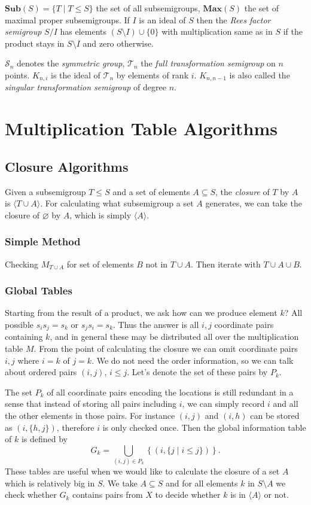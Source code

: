 \documentclass{amsart}
\newcommand{\cT}{{\mathcal T}}
\newcommand{\cS}{{\mathcal S}}
\newcommand{\Sub}{\mathbf{Sub}}
\newcommand{\Max}{\mathbf{Max}}
\theoremstyle{plain}
\theoremstyle{definition}
\begin{document}
$\Sub(S)=\big\{T\mid T\leq S \big\}$ the set of all subsemigroups, $\Max(S)$ the set of maximal proper subsemigroups.
If $I$ is an ideal of $S$ then the \emph{Rees factor semigroup} $S/I$ has elements $(S\setminus I)\cup\{0\}$ with multiplication same as in $S$ if the product stays in $S\setminus I$ and zero otherwise.

$\cS_n$ denotes the \emph{symmetric group}, $\cT_n$ the \emph{full transformation semigroup} on $n$ points.
$K_{n,i}$ is the ideal of $\cT_n$ by elements of rank $i$.
$K_{n,n-1}$ is also called the \emph{singular transformation semigroup} of degree $n$.

\section{Multiplication Table Algorithms}
\label{sec:multab}

\subsection{Closure Algorithms}
Given a subsemigroup $T\leq S$ and a set of elements  $A\subseteq S$, the \emph{closure} of $T$ by $A$ is $\langle T\cup A \rangle$.
For calculating what subsemigroup a set $A$ generates, we can take the closure of $\varnothing$ by $A$, which is simply $\langle A\rangle$.

\subsubsection{Simple Method}
Checking $M_{T\cup A}$ for set of elements $B$ not in $T\cup A$. Then iterate with $T\cup A\cup B$.
\subsubsection{Global Tables}
Starting from the result of a product, we ask how can we produce element $k$?
All possible $s_is_j=s_k$ or $s_js_i=s_k$.
Thus the  answer is all $i,j$ coordinate pairs containing $k$, and in general these may be distributed all over the multiplication table $M$.
From the point of calculating the closure we can  omit coordinate pairs $i,j$ where $i=k$ of $j=k$. 
We do not need the order information, so we can talk about ordered pairs $(i,j)$, $i\leq j$. 
Let's denote the set of these pairs by $P_k$.

The set $P_k$ of all coordinate pairs encoding the locations is still redundant in a sense that instead of storing all pairs including $i$, we can simply record $i$ and all the other elements in those pairs.
For instance $(i,j)$ and $(i,h)$ can be stored as $(i,\{h,j\})$, therefore $i$ is only checked once.
Then the  global information table of $k$ is defined by
$$G_k=\bigcup_{(i,j)\in P_k} \left\{ (i,\{j\mid i\leq j\})\right\}.$$
These tables are useful when we would like to calculate the closure of a set $A$ which is relatively big in $S$.
We take $A\subseteq S$ and for all elements $k$ in $S\setminus A$ we check whether $G_k$ contains pairs from $X$ to decide whether $k$ is in $\langle A\rangle$ or not. 
\end{document}
